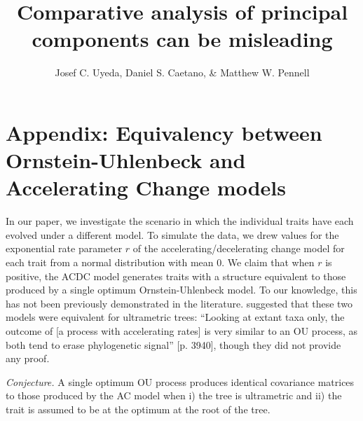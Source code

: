 \documentclass[12pt,twoside]{article}
\title{Comparative analysis of principal components can be misleading}
\author{Josef C. Uyeda, Daniel S. Caetano, \& Matthew W. Pennell}
\date{}
\begin{document}
\maketitle

\section{Appendix: Equivalency between Ornstein-Uhlenbeck and Accelerating Change models}

In our paper, we investigate the scenario in which the individual traits have each evolved under a different model. To simulate the data, we drew values for the exponential rate parameter $r$ of the accelerating/decelerating change \citep[ACDC;][]{Blomberg2003} model for each trait from a normal distribution with mean 0. We claim that when $r$ is positive, the ACDC model generates traits with a structure equivalent to those produced by a single optimum Ornstein-Uhlenbeck \citep[OU;][]{Hansen1997} model. To our knowledge, this has not been previously demonstrated in the literature. \citet{SlaterFossil} suggested that these two models were equivalent for ultrametric trees: ``Looking at extant taxa only, the outcome of [a process with accelerating rates] is very similar to an OU process, as both tend to erase phylogenetic signal'' [p. 3940], though they did not provide any proof.\bigskip

\noindent \emph{Conjecture.} A single optimum OU process produces identical covariance matrices to those produced by the AC model when i) the tree is ultrametric and ii) the trait is assumed to be at the optimum at the root of the tree.
\end{document}
